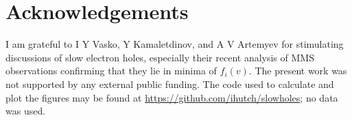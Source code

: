 \documentclass[pre]{revtex4-2}
\begin{document}
\section*{Acknowledgements}

I am grateful to I Y Vasko, Y Kamaletdinov, and A V Artemyev for
stimulating discussions of slow electron holes, especially their
recent analysis of MMS observations confirming that they lie in minima
of $f_i(v)$. The present work was not supported by any external public
funding. The code used to calculate and plot the figures may be found
at \url{https://github.com/ihutch/slowholes}; no data was used.


\end{document}
